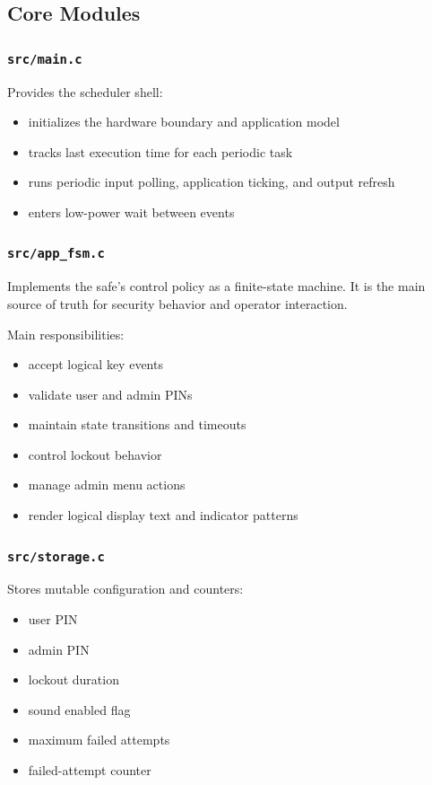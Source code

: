 \documentclass[11pt,a4paper]{article}
\begin{document}
\subsection{Core Modules}

\subsubsection*{\texttt{src/main.c}}

Provides the scheduler shell:

\begin{itemize}[leftmargin=1.5em]
\item initializes the hardware boundary and application model
\item tracks last execution time for each periodic task
\item runs periodic input polling, application ticking, and output refresh
\item enters low-power wait between events
\end{itemize}

\subsubsection*{\texttt{src/app\_fsm.c}}

Implements the safe's control policy as a finite-state machine. It is the main source of truth for
security behavior and operator interaction.

Main responsibilities:

\begin{itemize}[leftmargin=1.5em]
\item accept logical key events
\item validate user and admin PINs
\item maintain state transitions and timeouts
\item control lockout behavior
\item manage admin menu actions
\item render logical display text and indicator patterns
\end{itemize}

\subsubsection*{\texttt{src/storage.c}}

Stores mutable configuration and counters:

\begin{itemize}[leftmargin=1.5em]
\item user PIN
\item admin PIN
\item lockout duration
\item sound enabled flag
\item maximum failed attempts
\item failed-attempt counter
\end{itemize}
\end{document}
